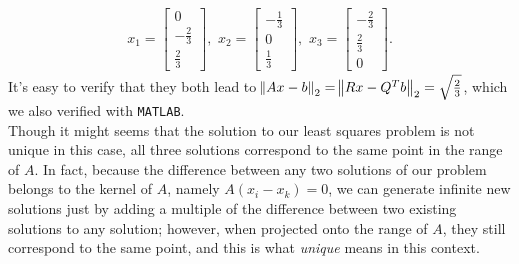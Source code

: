 \documentclass[11pt]{article}
\begin{document}
\begin{equation}\begin{split}
x_1 = \begin{bmatrix} 0 \\ -\frac23 \\ \frac23\end{bmatrix},\,\,
x_2 = \begin{bmatrix} -\frac13 \\ 0 \\ \frac13\end{bmatrix},\,\,
x_3 = \begin{bmatrix} -\frac23 \\ \frac23 \\ 0\end{bmatrix}.
\end{split}\nonumber\end{equation}
It's easy to verify that they both lead to $\norm{Ax-b}_2 = \norm{Rx-Q^Tb}_2 = \sqrt{\frac23}$, which we also verified with \texttt{MATLAB}. \\[0.3cm]
Though it might seems that the solution to our least squares problem is not unique in this case, all three solutions correspond to the same point in the range of $A$. In fact, because the difference between any two solutions of our problem belongs to the kernel of $A$, namely $A(x_i-x_k) = 0$, we can generate infinite new solutions just by adding a multiple of the difference between two existing solutions to any solution; however, when projected onto the range of $A$, they still correspond to the same point, and this is what \textit{unique} means in this context.
\end{document}

